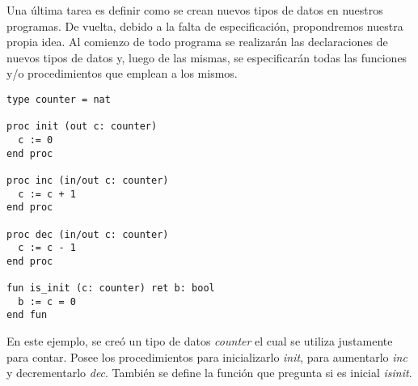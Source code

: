 \documentclass{article}
\begin{document}
Una última tarea es definir como se crean nuevos tipos de datos en nuestros programas.
De vuelta, debido a la falta de especificación, propondremos nuestra propia idea.
Al comienzo de todo programa se realizarán las declaraciones de nuevos tipos de datos y, luego de las mismas, se especificarán todas las funciones y/o procedimientos que emplean a los mismos.

\begin{lstlisting}
type counter = nat

proc init (out c: counter)
  c := 0
end proc

proc inc (in/out c: counter)
  c := c + 1
end proc

proc dec (in/out c: counter)
  c := c - 1
end proc

fun is_init (c: counter) ret b: bool
  b := c = 0
end fun
\end{lstlisting}

En este ejemplo, se creó un tipo de datos \textit{counter} el cual se utiliza justamente para contar.
Posee los procedimientos para inicializarlo \textit{init}, para aumentarlo \textit{inc} y decrementarlo \textit{dec}.
También se define la función que pregunta si es inicial \textit{is\gbajo init}.
\end{document}
